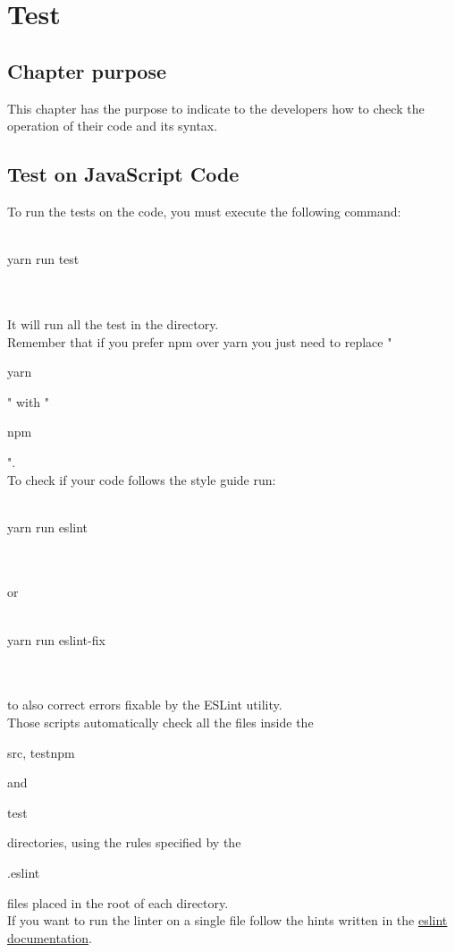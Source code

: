 \documentclass[ManualeSviluppatore]{subfiles}
\begin{document}
\chapter{Test}
\section{Chapter purpose}
This chapter has the purpose to indicate to the developers how to check the operation of their code and its syntax. \\

\section{Test on JavaScript Code}
To run the tests on the code, you must execute the following command: \\\\
\begin{ttfamily} \indent yarn run test \end{ttfamily} \\\\
It will run all the test in the  directory. \\
Remember that if you prefer npm over yarn you just need to replace "\begin{ttfamily}yarn\end{ttfamily}" with "\begin{ttfamily}npm\end{ttfamily}". \\
To check if your code follows the style guide run: \\\\
\begin{ttfamily} \indent yarn run eslint\end{ttfamily} \\\\
or \\\\
\begin{ttfamily} \indent yarn run eslint-fix\end{ttfamily} \\\\
to also correct errors fixable by the ESLint utility. \\
Those scripts automatically check all the files inside the \begin{ttfamily}src, testnpm\end{ttfamily} and \begin{ttfamily}test\end{ttfamily} directories, using the rules specified by the \begin{ttfamily}.eslint\end{ttfamily} files placed in the root of each directory.\\
If you want to run the linter on a single file follow the hints written in the \href{https://eslint.org/docs/user-guide/getting-started}{eslint documentation}.
\end{document}
